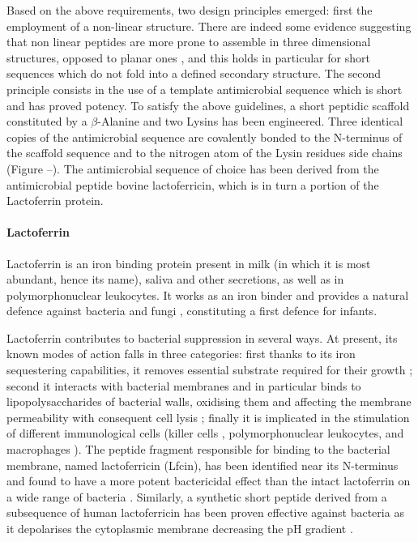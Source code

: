 Based on the above requirements, two design principles emerged: first the employment of a non-linear structure. There are indeed some evidence suggesting that non linear peptides are more prone to assemble in three dimensional structures, opposed to planar ones \cite{???}, and this holds in particular for short sequences which do not fold into a defined secondary structure.
%
The second principle consists in the use of a template antimicrobial sequence which is short and has proved potency.
%
To satisfy the above guidelines, a short peptidic scaffold constituted by a $\beta$-Alanine and two Lysins has been engineered.
%
Three identical copies of the antimicrobial sequence are covalently bonded to the N-terminus of the scaffold sequence and to the nitrogen atom of the Lysin residues side chains (Figure --).
%
The antimicrobial sequence of choice has been derived from the antimicrobial peptide bovine lactoferricin, which is in turn a portion of the Lactoferrin protein.

\paragraph{Lactoferrin} Lactoferrin is an iron binding protein present in milk (in which it is most abundant, hence its name), saliva and other secretions, as well as in polymorphonuclear leukocytes.
%
It works as an iron binder and provides a natural defence against bacteria and fungi \cite{Sanchez1992,Arnold1977,Arnold1980,Kirkpatrick1971,Jahani2015}, constituting a first defence for infants.

Lactoferrin contributes to bacterial suppression in several ways. At present, its known modes of action falls in three categories: first thanks to its iron sequestering capabilities, it removes essential substrate required for their growth \cite{Farnaud2003}; second it interacts with bacterial membranes and in particular binds to lipopolysaccharides of bacterial walls, oxidising them and affecting the membrane permeability with consequent cell lysis \cite{Farnaud2003}; finally it is implicated in the stimulation of different immunological cells (killer cells \cite{Shau1992}, polymorphonuclear leukocytes, and macrophages \cite{Gahr1991}).
The peptide fragment responsible for binding to the bacterial membrane, named lactoferricin (Lfcin), has been identified near its N-terminus and found to have a more potent bactericidal effect than the intact lactoferrin on a wide range of bacteria \cite{Gifford2005,Bellamy1992,Tomita1994,Wakabayashi1996}.
%
Similarly, a synthetic short peptide derived from a subsequence of human lactoferricin has been proven effective against bacteria as it depolarises the cytoplasmic membrane decreasing the pH gradient \cite{Aguilera1999}.

